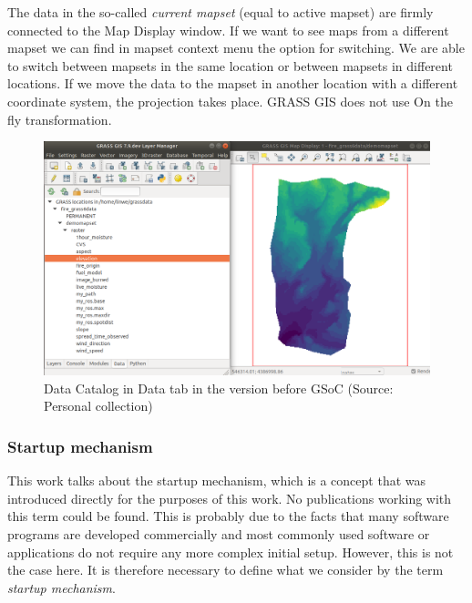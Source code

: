 \documentclass[a4paper,10pt,twoside]{article}
\begin{document}
The data in the so-called \textit{current mapset} (equal to active mapset) are firmly connected to the Map Display window. If we want to see maps from a different mapset we can find in mapset context menu the option for switching. We are able to switch between mapsets in the same location or between mapsets in different locations. If we move the data to the mapset in another location with a different coordinate system, the projection takes place. GRASS GIS does not use On the fly transformation.

\vspace{0.3cm}
\begin{figure}[hbt!] 
\begin{center}
\includegraphics[width=17cm]{../pictures/data_catalog_pred.png} 
\caption[Data Catalog in Data tab (version before GSoC)]{Data Catalog in Data tab in the version before GSoC (Source: Personal collection)}
\label{fig:data_catalog_pred}
\end{center}
\end{figure}



\newpage
\vspace*{-1cm}
\subsubsection{Startup mechanism}
\label{section:mechanism}
\noindent
\large
This work talks about the startup mechanism, which is a concept that was introduced directly for the purposes of this work. No publications working with this term could be found. This is probably due to the facts that many software programs are developed commercially and most commonly used software or applications do not require any more complex initial setup. However, this is not the case here. It is therefore necessary to define what we consider by the term \textit{startup mechanism}.
\end{document}
